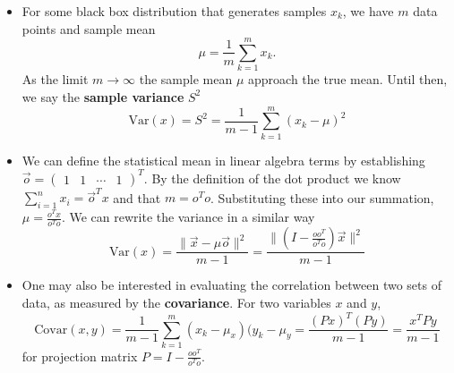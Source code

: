 \documentclass[11pt]{article}
\begin{document}
\begin{itemize}
	\item For some black box distribution that generates samples $x_k$, we have $m$ data points and sample mean 
		$$\mu = \frac{1}{m}\sum_{k=1}^{m}x_{k}.$$
	As the limit $m\to \infty$ the sample mean $\mu$ approach the true mean. Until then, we say the \textbf{sample variance} $S^2$
	$$\text{Var}(x) = S^2 = \frac{1}{m-1}\sum_{k=1}^{m} (x_{k}-\mu)^{2}$$
\item We can define the statistical mean in linear algebra terms by establishing $\vec{o} = \begin{pmatrix}
  1 & 1 & \cdots & 1
\end{pmatrix}^T$. By the definition of the dot product we know $\sum_{i=1}^{n} x_i= \vec{o}^T x$ and that $m=o^T o$. Substituting these into our summation, $\mu = \frac{o^Tx}{o^T o}$. We can rewrite the variance in a similar way
$$\text{Var}(x) = \frac{\|\vec{x} - \mu \vec{o}\|^2}{m-1} = \frac{\| (I - \frac{o o ^T}{o^T o} )\vec{x}\|^2}{m-1}$$
\item One may also be interested in evaluating the correlation between two sets of data, as measured by the \textbf{covariance}. For two variables $x$ and $y$,
	$$\text{Covar}(x, y) = \frac{1}{m-1}\sum_{k=1}^{m}(x_k - \mu_x)(y_k - \mu_{y} = \frac{(Px)^T(Py)}{m-1} = \frac{x^TPy}{m-1}$$
	for projection matrix $P = I - \frac{oo^T}{o^To}$.
\end{itemize}
\end{document}
